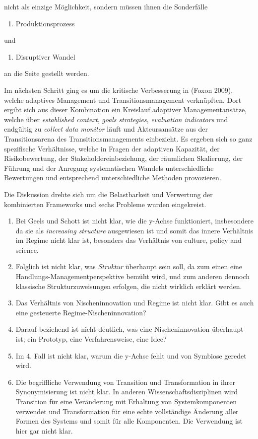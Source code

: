 \documentclass[11pt,a4paper]{article}
\begin{document}
nicht als einzige Möglichkeit, sondern müssen ihnen die Sonderfälle

\begin{enumerate}[noitemsep]
\item
  Produktionsprozess
\end{enumerate}

und

\begin{enumerate}
[noitemsep]
\item
  Disruptiver Wandel
\end{enumerate}

an die Seite gestellt werden.

Im nächsten Schritt ging es um die kritische Verbesserung in (Foxon
2009), welche adaptives Management und Transitionsmanagement
verknüpften. Dort ergibt sich aus dieser Kombination ein Kreislauf
adaptiver Managementansätze, welche über \emph{established context},
\emph{goals strategies}, \emph{evaluation indicators} und endgültig zu
\emph{collect data monitor} läuft und Akteursansätze aus der
Transitionsarena des Transitionsmanagements einbezieht. Es ergeben sich
so ganz spezifische Verhältnisse, welche in Fragen der adaptiven
Kapazität, der Risikobewertung, der Stakeholdereinbeziehung, der
räumlichen Skalierung, der Führung und der Anregung systematischen
Wandels unterschiedliche Bewertungen und entsprechend unterschiedliche
Methoden provozieren.

Die Diskussion drehte sich um die Belastbarkeit und Verwertung der
kombinierten Frameworks und sechs Probleme wurden eingekreist.

\begin{enumerate}
\def\labelenumi{\arabic{enumi}.}
\item
  Bei Geels und Schott ist nicht klar, wie die y-Achse funktioniert,
  insbesondere da sie als \emph{increasing structure} ausgewiesen ist
  und somit das innere Verhältnis im Regime nicht klar ist, besonders
  das Verhältnis von culture, policy and science.
\item
  Folglich ist nicht klar, was \emph{Struktur} überhaupt sein soll, da
  zum einen eine Handlungs-Managementperspektive bemüht wird, und zum
  anderen dennoch klassische Strukturzuweisungen erfolgen, die nicht
  wirklich erklärt werden.
\item
  Das Verhältnis von Nischeninnovation und Regime ist nicht klar. Gibt
  es auch eine gesteuerte Regime-Nischeninnovation?
\item
  Darauf beziehend ist nicht deutlich, was eine Nischeninnovation
  überhaupt ist; ein Prototyp, eine Verfahrensweise, eine Idee?
\item
  Im 4. Fall ist nicht klar, warum die y-Achse fehlt und von Symbiose
  geredet wird.
\item
  Die begriffliche Verwendung von Transition und Transformation in ihrer
  Synonymisierung ist nicht klar. In anderen Wissenschaftsdisziplinen
  wird Transition für eine Veränderung mit Erhaltung von
  Systemkomponenten verwendet und Transformation für eine echte
  vollständige Änderung aller Formen des Systems und somit für alle
  Komponenten. Die Verwendung ist hier gar nicht klar.
\end{enumerate}
\end{document}

